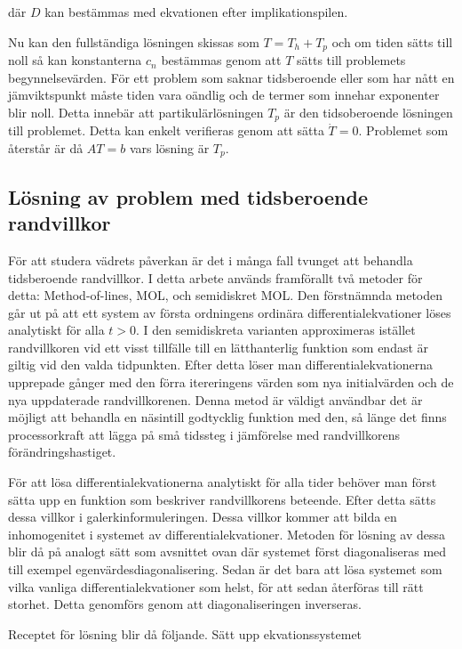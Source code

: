 där $D$ kan bestämmas med ekvationen efter implikationspilen.

Nu kan den fullständiga lösningen skissas som $T = T_h + T_p$ och om
tiden sätts till noll så kan konstanterna $c_n$ bestämmas genom
att $T$ sätts till problemets begynnelsevärden. För ett problem som
saknar tidsberoende eller som har nått en jämviktspunkt måste
tiden vara oändlig och de termer som innehar exponenter blir noll.
Detta innebär att partikulärlösningen $T_p$ är den tidsoberoende lösningen
till problemet. Detta kan enkelt verifieras genom att sätta $\dot{T} = 0$.
Problemet som återstår är då $AT = b$ vars lösning är $T_p$.

\subsection{Lösning av problem med tidsberoende randvillkor}
\label{subsec:mol}

För att studera vädrets påverkan är det i många fall tvunget att behandla
tidsberoende randvillkor. I detta arbete används framförallt två metoder för detta:
Method-of-lines, MOL, och semidiskret MOL. Den förstnämnda metoden går ut på att
ett system av första ordningens ordinära differentialekvationer löses analytiskt för
alla $t>0$. I den semidiskreta varianten approximeras istället randvillkoren vid
ett visst tillfälle till en lätthanterlig funktion som endast är giltig vid
den valda tidpunkten. Efter detta löser man differentialekvationerna upprepade gånger
med den förra itereringens värden som nya initialvärden och de nya uppdaterade
randvillkorenen. Denna metod är väldigt användbar det är möjligt att behandla en näsintill godtycklig
funktion med den, så länge det finns  processorkraft att lägga på små tidssteg i jämförelse med
randvillkorens förändringshastiget.

För att lösa differentialekvationerna analytiskt för alla tider behöver man först
sätta upp en funktion som beskriver randvillkorens beteende. Efter detta sätts
dessa villkor i galerkinformuleringen. Dessa villkor kommer att bilda en inhomogenitet
i systemet av differentialekvationer. Metoden för lösning av dessa blir då på analogt sätt
som avsnittet ovan där systemet först diagonaliseras med till exempel egenvärdesdiagonalisering. Sedan är det bara att lösa systemet som vilka vanliga differentialekvationer som helst, för att sedan
återföras till rätt storhet. Detta genomförs genom att diagonaliseringen inverseras.

Receptet för lösning blir då följande. Sätt upp ekvationssystemet


